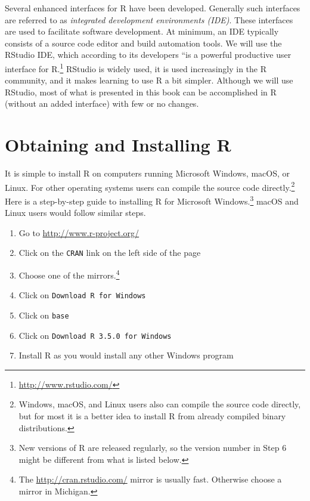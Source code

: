 \documentclass[]{krantz}
\providecommand{\tightlist}{%
  \setlength{\itemsep}{0pt}\setlength{\parskip}{0pt}}
\theoremstyle{definition}
\theoremstyle{definition}
\theoremstyle{definition}
\theoremstyle{remark}
\begin{document}
Several enhanced interfaces for R have been developed. Generally such
interfaces are referred to as \emph{integrated development environments
(IDE)}. These interfaces are used to facilitate software development. At
minimum, an IDE typically consists of a source code editor and build
automation tools. We will use the RStudio IDE, which according to its
developers ``is a powerful productive user interface for R.\footnote{\url{http://www.rstudio.com/}}
RStudio is widely used, it is used increasingly in the R community, and
it makes learning to use R a bit simpler. Although we will use RStudio,
most of what is presented in this book can be accomplished in R (without
an added interface) with few or no changes.

\section{Obtaining and Installing R}\label{obtaining-and-installing-r}

It is simple to install R on computers running Microsoft Windows, macOS,
or Linux. For other operating systems users can compile the source code
directly.\footnote{Windows, macOS, and Linux users also can compile the
  source code directly, but for most it is a better idea to install R
  from already compiled binary distributions.} Here is a step-by-step
guide to installing R for Microsoft Windows.\footnote{New versions of R
  are released regularly, so the version number in Step 6 might be
  different from what is listed below.} macOS and Linux users would
follow similar steps.

\begin{enumerate}
\def\labelenumi{\arabic{enumi}.}
\tightlist
\item
  Go to \url{http://www.r-project.org/}
\item
  Click on the \texttt{CRAN} link on the left side of the page
\item
  Choose one of the mirrors.\footnote{The \url{http://cran.rstudio.com/}
    mirror is usually fast. Otherwise choose a mirror in Michigan.}
\item
  Click on \texttt{Download\ R\ for\ Windows}
\item
  Click on \texttt{base}
\item
  Click on \texttt{Download\ R\ 3.5.0\ for\ Windows}
\item
  Install R as you would install any other Windows program
\end{enumerate}
\end{document}
